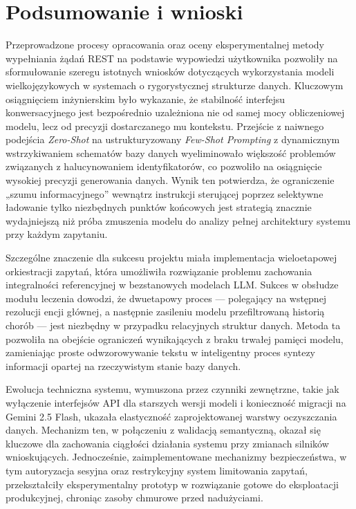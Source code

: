 \section{Podsumowanie i wnioski}

Przeprowadzone procesy opracowania oraz oceny eksperymentalnej metody wypełniania żądań REST na podstawie wypowiedzi użytkownika pozwoliły na sformułowanie szeregu istotnych wniosków dotyczących wykorzystania modeli wielkojęzykowych w systemach o rygorystycznej strukturze danych. Kluczowym osiągnięciem inżynierskim było wykazanie, że stabilność interfejsu konwersacyjnego jest bezpośrednio uzależniona nie od samej mocy obliczeniowej modelu, lecz od precyzji dostarczanego mu kontekstu. Przejście z naiwnego podejścia \textit{Zero-Shot} na ustrukturyzowany \textit{Few-Shot Prompting} z dynamicznym wstrzykiwaniem schematów bazy danych wyeliminowało większość problemów związanych z halucynowaniem identyfikatorów, co pozwoliło na osiągnięcie wysokiej precyzji generowania danych. Wynik ten potwierdza, że ograniczenie „szumu informacyjnego” wewnątrz instrukcji sterującej poprzez selektywne ładowanie tylko niezbędnych punktów końcowych jest strategią znacznie wydajniejszą niż próba zmuszenia modelu do analizy pełnej architektury systemu przy każdym zapytaniu.

Szczególne znaczenie dla sukcesu projektu miała implementacja wieloetapowej orkiestracji zapytań, która umożliwiła rozwiązanie problemu zachowania integralności referencyjnej w bezstanowych modelach LLM. Sukces w obsłudze modułu leczenia dowodzi, że dwuetapowy proces — polegający na wstępnej rezolucji encji głównej, a następnie zasileniu modelu przefiltrowaną historią chorób — jest niezbędny w przypadku relacyjnych struktur danych. Metoda ta pozwoliła na obejście ograniczeń wynikających z braku trwałej pamięci modelu, zamieniając proste odwzorowywanie tekstu w inteligentny proces syntezy informacji opartej na rzeczywistym stanie bazy danych. %

Ewolucja techniczna systemu, wymuszona przez czynniki zewnętrzne, takie jak wyłączenie interfejsów API dla starszych wersji modeli i konieczność migracji na Gemini 2.5 Flash, ukazała elastyczność zaprojektowanej warstwy oczyszczania danych. Mechanizm ten, w połączeniu z walidacją semantyczną, okazał się kluczowe dla zachowania ciągłości działania systemu przy zmianach silników wnioskujących. Jednocześnie, zaimplementowane mechanizmy bezpieczeństwa, w tym autoryzacja sesyjna oraz restrykcyjny system limitowania zapytań, przekształciły eksperymentalny prototyp w rozwiązanie gotowe do eksploatacji produkcyjnej, chroniąc zasoby chmurowe przed nadużyciami.

